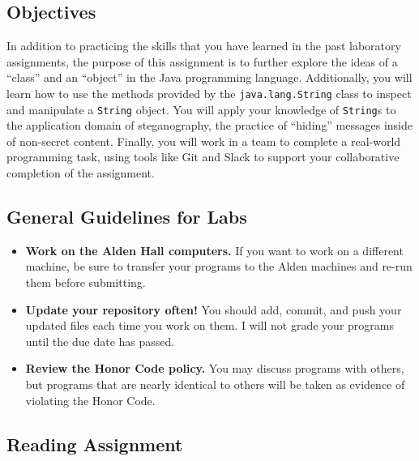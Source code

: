 



\subsection*{Objectives}
\vspace{-0.05in}

In addition to practicing the skills that you have learned in the past laboratory assignments, the purpose of this
assignment is to further explore the ideas of a ``class'' and an ``object'' in the Java programming language.
Additionally, you will learn how to use the methods provided by the {\tt java.lang.String} class to inspect and
manipulate a {\tt String} object. You will apply your knowledge of {\tt String}s to the application domain of
steganography, the practice of ``hiding'' messages inside of non-secret content. Finally, you will work in a team to
complete a real-world programming task, using tools like Git and Slack to support your collaborative completion of the
assignment.

\subsection*{General Guidelines for Labs}
\vspace{-0.05in}
\begin{itemize}
\item
{\bf Work on the Alden Hall computers.} If you want to work on a different
machine, be sure to transfer your programs to the Alden
machines and re-run them before submitting.
\item
{\bf Update your repository often!} You should add, commit,
and push your updated files each time you work on them.  I will not grade
your programs until the due date has passed.
\item
{\bf Review the Honor Code policy.} You
may discuss programs with others, but programs that are nearly identical
to others will be taken as evidence of violating the Honor Code.
\end{itemize}

\vspace{-0.1in}
\subsection*{Reading Assignment}
\vspace{-0.05in}

